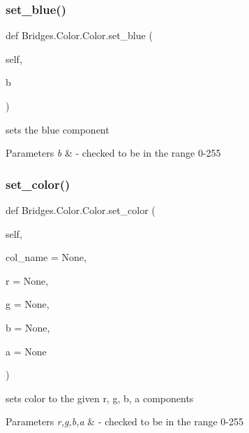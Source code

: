 \subsubsection{\texorpdfstring{set\+\_\+blue()}{set\_blue()}}
{\footnotesize\ttfamily def Bridges.\+Color.\+Color.\+set\+\_\+blue (\begin{DoxyParamCaption}\item[{}]{self,  }\item[{}]{b }\end{DoxyParamCaption})}



sets the blue component 


\begin{DoxyParams}{Parameters}
{\em b} & -\/ checked to be in the range 0-\/255 \\
\hline
\end{DoxyParams}
\mbox{\label{class_bridges_1_1_color_1_1_color_abb49cdb739a55e982a4080bfa761a701}} 
\subsubsection{\texorpdfstring{set\+\_\+color()}{set\_color()}}
{\footnotesize\ttfamily def Bridges.\+Color.\+Color.\+set\+\_\+color (\begin{DoxyParamCaption}\item[{}]{self,  }\item[{}]{col\+\_\+name = {\ttfamily None},  }\item[{}]{r = {\ttfamily None},  }\item[{}]{g = {\ttfamily None},  }\item[{}]{b = {\ttfamily None},  }\item[{}]{a = {\ttfamily None} }\end{DoxyParamCaption})}



sets color to the given r, g, b, a components 


\begin{DoxyParams}{Parameters}
{\em r,g,b,a} & -\/ checked to be in the range 0-\/255 \\
\hline
\end{DoxyParams}
\mbox{\label{class_bridges_1_1_color_1_1_color_a6aa178a4f074320fd1da522d446585b8}} 
